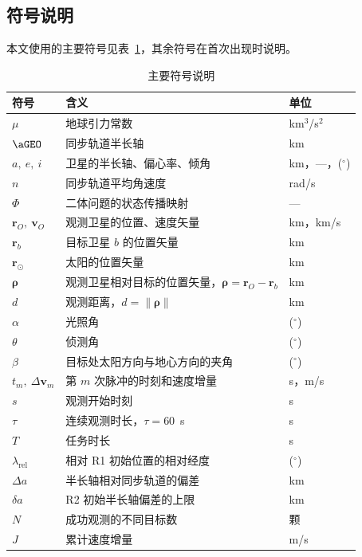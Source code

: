 \subsection{符号说明}

本文使用的主要符号见表~\ref{tab:symbols}，其余符号在首次出现时说明。

\begin{table}[!htb]
  \centering
  \caption{主要符号说明}
  \label{tab:symbols}
  \renewcommand{\arraystretch}{1.22}
  \begin{tabular*}{\textwidth}{@{\extracolsep{\fill}}lll}
    \toprule
    符号 & 含义 & 单位 \\
    \midrule
    $\mu$ & 地球引力常数 & km$^3$/s$^2$ \\
    $\aGEO$ & 同步轨道半长轴 & km \\
    $a,\ e,\ i$ & 卫星的半长轴、偏心率、倾角 & km，—，($^\circ$) \\
    $n$ & 同步轨道平均角速度 & rad/s \\
    $\Phi$ & 二体问题的状态传播映射 & — \\
    $\bm r_O,\ \bm v_O$ & 观测卫星的位置、速度矢量 & km，km/s \\
    $\bm r_b$ & 目标卫星 $b$ 的位置矢量 & km \\
    $\bm r_\odot$ & 太阳的位置矢量 & km \\
    $\bm\rho$ & 观测卫星相对目标的位置矢量，$\bm\rho = \bm r_O - \bm r_b$ & km \\
    $d$ & 观测距离，$d = \|\bm\rho\|$ & km \\
    $\alpha$ & 光照角 & ($^\circ$) \\
    $\theta$ & 侦测角 & ($^\circ$) \\
    $\beta$ & 目标处太阳方向与地心方向的夹角 & ($^\circ$) \\
    $t_m,\ \Delta\bm v_m$ & 第 $m$ 次脉冲的时刻和速度增量 & s，m/s \\
    $s$ & 观测开始时刻 & s \\
    $\tau$ & 连续观测时长，$\tau = 60$~s & s \\
    $T$ & 任务时长 & s \\
    $\lambda_{\mathrm{rel}}$ & 相对 R1 初始位置的相对经度 & ($^\circ$) \\
    $\Delta a$ & 半长轴相对同步轨道的偏差 & km \\
    $\delta a$ & R2 初始半长轴偏差的上限 & km \\
    $N$ & 成功观测的不同目标数 & 颗 \\
    $J$ & 累计速度增量 & m/s \\
    \bottomrule
  \end{tabular*}
\end{table}
